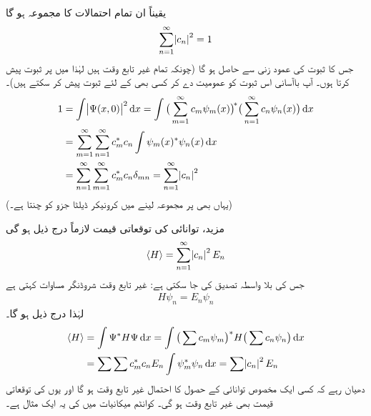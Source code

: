 یقیناً ان تمام احتمالات کا مجموعہ  ہو گا
\begin{align}
\sum_{n=1}^{\infty}\abs{c_n}^2=1
\end{align}
جس کا ثبوت  کی عمود زنی سے حاصل ہو گا (چونکہ تمام  غیر تابع وقت ہیں لہٰذا میں  پر ثبوت پیش کرتا ہوں۔ آپ باآسانی اس ثبوت کو عمومیت دے کر کسی بھی  کے لئے ثبوت پیش کر سکتے ہیں)۔
\begin{align*}
1&=\int\abs{\Psi(x,0)}^2\dif x=\int \big(\sum_{m=1}^{\infty}c_m\psi_m(x)\big)^{\!*}\big(\sum_{n=1}^{\infty}c_n\psi_n(x)\big)\dif x\\
&=\sum_{m=1}^{\infty}\sum_{n=1}^{\infty}c_m^*c_n\int\psi_m(x)^*\psi_n(x)\dif x\\
&=\sum_{n=1}^{\infty}\sum_{m=1}^{\infty}c_m^*c_n\delta_{mn}=\sum_{n=1}^{\infty}\abs{c_n}^2
\end{align*}
(یہاں بھی  پر مجموعہ لینے میں کرونیکر ڈیلٹا جزو  کو چنتا ہے۔)

مزید، توانائی کی توقعاتی قیمت لازماً درج ذیل ہو گی  
\begin{align}\label{مساوات_غیر_تابع_وقت_توانائی_توقعاتی_قیمت}
\langle H\rangle=\sum_{n=1}^{\infty} \abs{c_n}^2 E_n
\end{align} 
 جس کی بلا واسطہ تصدیق کی جا سکتی ہے: غیر تابع وقت شروڈنگر مساوات کہتی ہے
\begin{align}
H\psi_n=E_n\psi_n
\end{align}
لہٰذا درج ذیل ہو گا۔
\begin{align*}
\langle H \rangle &=\int \Psi^*H\Psi\dif x=\int \big(\sum c_m\psi_m\big)^* H\big(\sum c_n\psi_n\big)\dif x\\
&=\sum\sum c_m^*c_nE_n\int \psi_m^*\psi_n\dif x=\sum\abs{c_n}^2 E_n
\end{align*}
دھیان رہے کہ کسی ایک مخصوص توانائی کے حصول  کا احتمال غیر تابع وقت ہو گا اور یوں  کی توقعاتی قیمت بھی غیر تابع وقت ہو گی۔ کوانٹم میکانیات میں   کی یہ ایک مثال ہے۔

